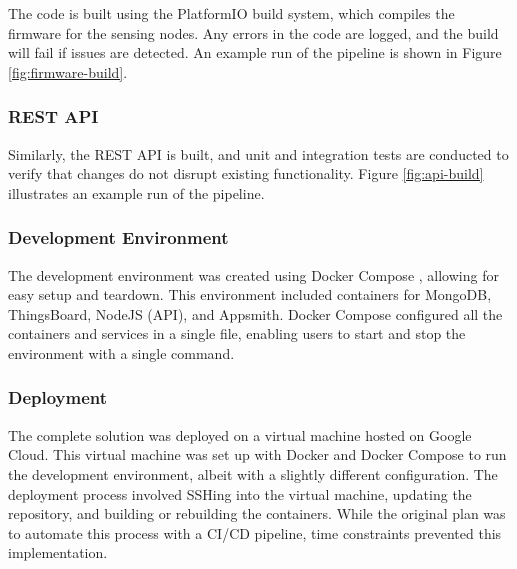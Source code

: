 The code is built using the PlatformIO build system, which compiles the firmware for the sensing nodes. Any errors in 
the code are logged, and the build will fail if issues are detected. An example run of the pipeline is shown in Figure 
\ref{fig:firmware-build}.

\subsubsection{REST API}

Similarly, the REST API is built, and unit and integration tests are conducted to verify that changes do not disrupt 
existing functionality. Figure \ref{fig:api-build} illustrates an example run of the pipeline.

\subsubsection{Development Environment}

The development environment was created using Docker Compose \cite{Docker2024}, allowing for easy setup and teardown. 
This environment included containers for MongoDB, ThingsBoard, NodeJS (API), and Appsmith. Docker Compose configured all 
the containers and services in a single file, enabling users to start and stop the environment with a single command.

\subsubsection{Deployment}

The complete solution was deployed on a virtual machine hosted on Google Cloud. This virtual machine was set up with 
Docker and Docker Compose to run the development environment, albeit with a slightly different configuration. The 
deployment process involved SSHing into the virtual machine, updating the repository, and building or rebuilding the 
containers. While the original plan was to automate this process with a CI/CD pipeline, time constraints prevented this 
implementation.